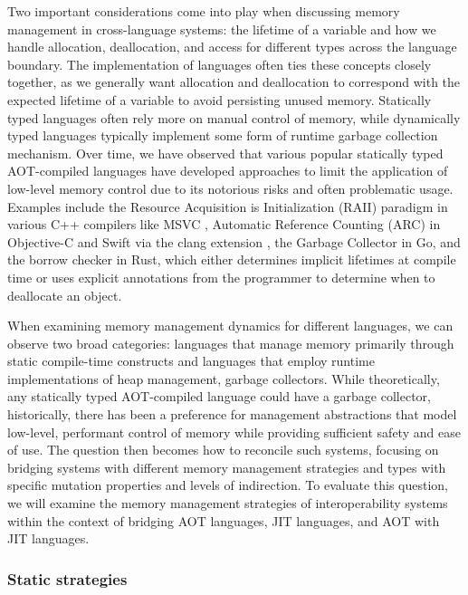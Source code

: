 Two important considerations come into play when discussing memory management in cross-language systems: the lifetime of a variable and how we handle allocation, deallocation, and access for different types across the language boundary. The implementation of languages often ties these concepts closely together, as we generally want allocation and deallocation to correspond with the expected lifetime of a variable to avoid persisting unused memory. Statically typed languages often rely more on manual control of memory, while dynamically typed languages typically implement some form of runtime garbage collection mechanism. Over time, we have observed that various popular statically typed AOT-compiled languages have developed approaches to limit the application of low-level memory control due to its notorious risks and often problematic usage. Examples include the Resource Acquisition is Initialization (RAII) paradigm in various C++ compilers like MSVC \cite{microsoft_raii}, Automatic Reference Counting (ARC) in Objective-C and Swift via the clang extension \cite{clang_arc}, the Garbage Collector in Go, and the borrow checker in Rust, which either determines implicit lifetimes at compile time or uses explicit annotations from the programmer to determine when to deallocate an object.

When examining memory management dynamics for different languages, we can observe two broad categories: languages that manage memory primarily through static compile-time constructs and languages that employ runtime implementations of heap management,  \ie garbage collectors. While theoretically, any statically typed AOT-compiled language could have a garbage collector, historically, there has been a preference for management abstractions that model low-level, performant control of memory while providing sufficient safety and ease of use. The question then becomes how to reconcile such systems, focusing on bridging systems with different memory management strategies and types with specific mutation properties and levels of indirection. To evaluate this question, we will examine the memory management strategies of interoperability systems within the context of bridging AOT languages, JIT languages, and AOT with JIT languages. 

\subsubsection{Static strategies}\label{s:static_mem_mgmt}

